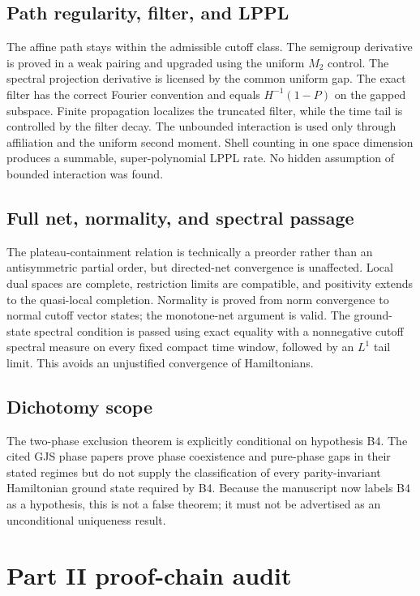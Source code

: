 \documentclass[11pt,a4paper]{article}
\begin{document}
\subsection{Path regularity, filter, and LPPL}

The affine path stays within the admissible cutoff class.  The semigroup derivative is
proved in a weak pairing and upgraded using the uniform $M_2$ control.  The spectral
projection derivative is licensed by the common uniform gap.  The exact filter has the
correct Fourier convention and equals $H^{-1}(1-P)$ on the gapped subspace.  Finite
propagation localizes the truncated filter, while the time tail is controlled by the
filter decay.  The unbounded interaction is used only through affiliation and the
uniform second moment.  Shell counting in one space dimension produces a summable,
super-polynomial LPPL rate.  No hidden assumption of bounded interaction was found.

\subsection{Full net, normality, and spectral passage}

The plateau-containment relation is technically a preorder rather than an antisymmetric
partial order, but directed-net convergence is unaffected.  Local dual spaces are
complete, restriction limits are compatible, and positivity extends to the quasi-local
completion.  Normality is proved from norm convergence to normal cutoff vector states;
the monotone-net argument is valid.  The ground-state spectral condition is passed using
exact equality with a nonnegative cutoff spectral measure on every fixed compact time
window, followed by an $L^1$ tail limit.  This avoids an unjustified convergence of
Hamiltonians.

\subsection{Dichotomy scope}

The two-phase exclusion theorem is explicitly conditional on hypothesis B4.  The cited
GJS phase papers prove phase coexistence and pure-phase gaps in their stated regimes but
do not supply the classification of every parity-invariant Hamiltonian ground state
required by B4.  Because the manuscript now labels B4 as a hypothesis, this is not a
false theorem; it must not be advertised as an unconditional uniqueness result.

\section{Part II proof-chain audit}
\end{document}
